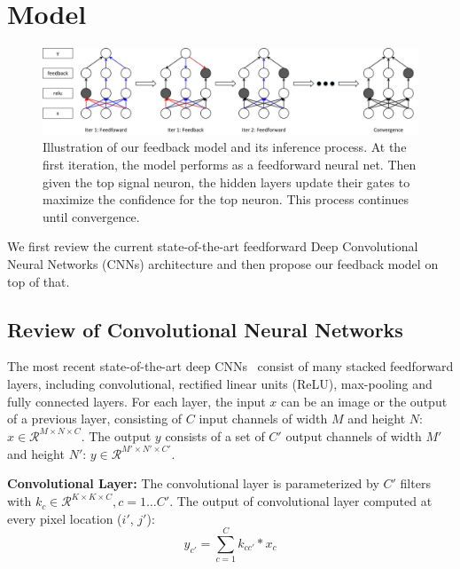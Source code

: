 \section{Model}
\label{sec:model}

\setlength{\tabcolsep}{2pt}
\begin{figure}
\begin{center}
\includegraphics[width=0.95\linewidth]{figs/model/model}
\caption{Illustration of our feedback model and its inference process. At the first iteration, the model performs as a feedforward neural net. Then given the top signal neuron, the hidden layers update their gates to maximize the confidence for the top neuron. This process continues until convergence.}
\label{fig:model}
\end{center}
\end{figure}

We first review the current state-of-the-art feedforward Deep Convolutional Neural Networks (CNNs) architecture and then propose our feedback model on top of that. 

\subsection{Review of Convolutional Neural Networks}
The most recent state-of-the-art deep CNNs~\cite{Simonyan2014Very} consist of many stacked feedforward layers, including convolutional, rectified linear units (ReLU), max-pooling and fully connected layers. For each layer, the input $x$ can be an image or the output of a previous layer, consisting of $C$ input channels of width $M$ and height $N$: $x \in \mathcal{R}^{M \times N \times C}$. The output $y$ consists of a set of $C'$ output channels of width $M'$ and height $N'$: $y \in \mathcal{R}^{M' \times N' \times C'}$. 

\textbf{Convolutional Layer:} 
The convolutional layer is parameterized by $C'$ filters with $k_c \in \mathcal{R}^{K \times K \times C}, c=1\ldots C'$. The output of convolutional layer computed at every pixel location ($i'$, $j'$):
\begin{equation}
y_{c'} = \sum_{c=1}^C k_{cc'} * x_c
\end{equation}

